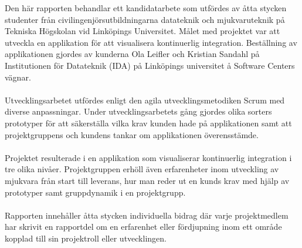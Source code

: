 Den här rapporten behandlar ett kandidatarbete som utfördes av åtta stycken studenter från civilingenjörsutbildningarna datateknik och mjukvaruteknik på Tekniska Högskolan vid Linköpings Universitet. Målet med projektet var att utveckla en applikation för att visualisera kontinuerlig integration. Beställning av applikationen gjordes av kunderna Ola Leifler och Kristian Sandahl på Institutionen för Datateknik (IDA) på Linköpings universitet å Software Centers vägnar.
\\ \\
Utvecklingsarbetet utfördes enligt den agila utvecklingsmetodiken Scrum med diverse anpassningar. Under utvecklingsarbetets gång gjordes olika sorters prototyper för att säkerställa vilka krav kunden hade på applikationen samt att projektgruppens och kundens tankar om applikationen överensstämde.
\\ \\
Projektet resulterade i en applikation som visualiserar kontinuerlig integration i tre olika nivåer. Projektgruppen erhöll även erfarenheter inom utveckling av mjukvara från start till leverans, hur man reder ut en kunds krav med hjälp av prototyper samt gruppdynamik i en projektgrupp.
\\ \\
Rapporten innehåller åtta stycken individuella bidrag där varje projektmedlem har skrivit en rapportdel om en erfarenhet eller fördjupning inom ett område kopplad till sin projektroll eller utvecklingen.
